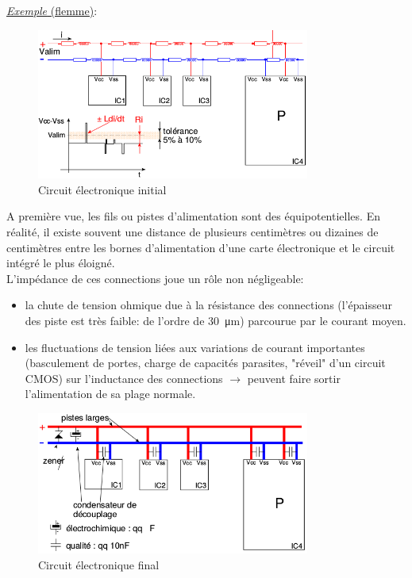 \underline{\textit{Exemple} (flemme)}:
\begin{figure}[H] 
	\centering 
	\includegraphics[width=0.8\textwidth,height=10\baselineskip,keepaspectratio]{ch3/image9} 
	\caption{Circuit électronique initial} 
\end{figure}
A première vue, les fils ou pistes d'alimentation sont des équipotentielles. En réalité, il existe souvent une distance de plusieurs centimètres ou dizaines de centimètres entre les bornes d'alimentation d'une carte électronique et le circuit intégré le plus éloigné.\\
L'impédance de ces connections joue un rôle non négligeable:
\begin{itemize}
\item la chute de tension ohmique due à la résistance des connections (l'épaisseur des piste est très faible: de l'ordre de \SI{30}{\micro\meter}) parcourue par le courant moyen.
\item les fluctuations de tension liées aux variations de courant importantes (basculement de portes, charge de capacités parasites, "réveil" d'un circuit CMOS) sur l'inductance des connections \(\rightarrow\) peuvent faire sortir l'alimentation de sa plage normale.
\end{itemize}
\begin{figure}[H] 
	\centering 
	\includegraphics[width=0.8\textwidth,height=10\baselineskip,keepaspectratio]{ch3/image10} 
	\caption{Circuit électronique final} 
\end{figure}
